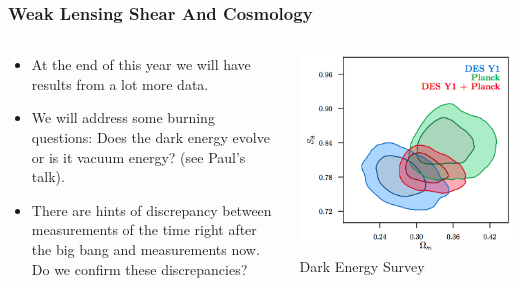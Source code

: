 \documentclass{beamer}
\begin{document}
\frame
{

    \frametitle{Weak Lensing Shear And Cosmology}


    \begin{columns}
        \begin{column}{0.5\textwidth}
            \begin{itemize}

                \item At the end of this year we will have results from a lot more data.

                \item We will address some burning questions: Does the dark
                    energy evolve or is it vacuum energy? (see Paul's talk).

                \item There are hints of discrepancy between measurements of
                    the time right after the big bang and measurements now.  Do
                    we confirm these discrepancies?

            \end{itemize}

        \end{column}
        \begin{column}{0.5\textwidth}
            \begin{center}
                \includegraphics[width=\textwidth]{3x2-fig10.png}
                \newline
                {\tiny Dark Energy Survey}
            \end{center}
        \end{column}

    \end{columns}


}
\end{document}
